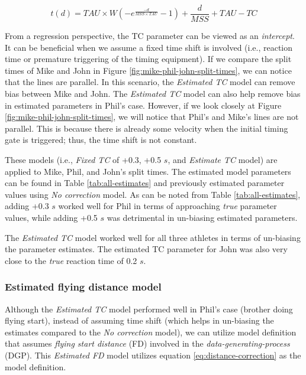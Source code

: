 \documentclass[fleqn,10pt,lineno]{wlpeerj} %
\begin{document}
\begin{equation}
  t(d) = TAU \times W(-e^{\frac{-d}{MSS \times TAU}} - 1) + \frac{d}{MSS} + TAU - TC \label{eq:time-correction}
\end{equation}

From a regression perspective, the TC parameter can be viewed as an \emph{intercept}. It can be beneficial when we assume a fixed time shift is involved (i.e., reaction time or premature triggering of the timing equipment). If we compare the split times of Mike and John in Figure \ref{fig:mike-phil-john-split-times}, we can notice that the lines are parallel. In this scenario, the \emph{Estimated TC} model can remove bias between Mike and John. The \emph{Estimated TC} model can also help remove bias in estimated parameters in Phil's case. However, if we look closely at Figure \ref{fig:mike-phil-john-split-times}, we will notice that Phil's and Mike's lines are not parallel. This is because there is already some velocity when the initial timing gate is triggered; thus, the time shift is not constant.

These models (i.e., \emph{Fixed TC} of +0.3, +0.5 \(s\), and \emph{Estimate TC} model) are applied to Mike, Phil, and John's split times. The estimated model parameters can be found in Table \ref{tab:all-estimates} and previously estimated parameter values using \emph{No correction} model. As can be noted from Table \ref{tab:all-estimates}, adding +0.3 \(s\) worked well for Phil in terms of approaching \emph{true} parameter values, while adding +0.5 \(s\) was detrimental in un-biasing estimated parameters.

The \emph{Estimated TC} model worked well for all three athletes in terms of un-biasing the parameter estimates. The estimated TC parameter for John was also very close to the \emph{true} reaction time of 0.2 \(s\).

\hypertarget{estimated-flying-distance-model}{%
\subsubsection{Estimated flying distance model}\label{estimated-flying-distance-model}}

Although the \emph{Estimated TC} model performed well in Phil's case (brother doing flying start), instead of assuming time shift (which helps in un-biasing the estimates compared to the \emph{No correction} model), we can utilize model definition that assumes \emph{flying start distance} (FD) involved in the \emph{data-generating-process} (DGP). This \emph{Estimated FD} model utilizes equation \eqref{eq:distance-correction} as the model definition.
\end{document}
